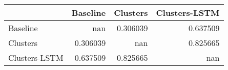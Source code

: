 \begin{tabular}{lrrr}
\toprule
               &   Baseline &   Clusters &   Clusters-LSTM \\
\midrule
 Baseline      & nan        &   0.306039 &        0.637509 \\
 Clusters      &   0.306039 & nan        &        0.825665 \\
 Clusters-LSTM &   0.637509 &   0.825665 &      nan        \\
\bottomrule
\end{tabular}